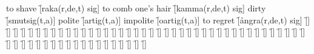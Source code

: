 \begin{questions}
\begin{multicols}{2}
        \question to shave \f[raka(r,de,t) sig]
        \question to comb one's hair \f[kamma(r,de,t) sig]
        \question dirty \f[smutsig(t,a)]
        \question polite \f[artig(t,a)]
        \question impolite \f[oartig(t,a)]
        \question to regret \f[ångra(r,de,t) sig]
        \question \f[]
        \question \f[]
        \question \f[]
        \question \f[]
        \question \f[]
        \question \f[]
        \question \f[]
        \question \f[]
        \question \f[]
        \question \f[]
        \question \f[]
        \question \f[]
        \question \f[]
        \question \f[]
        \question \f[]
        \question \f[]
        \question \f[]
        \question \f[]
        \question \f[]
        \question \f[]
        \question \f[]
        \question \f[]
        \question \f[]
        \question \f[]
        \question \f[]
        \question \f[]
        \question \f[]
        \question \f[]
        \question \f[]
        \question \f[]
        \question \f[]
        \question \f[]
        \question \f[]
        \question \f[]
        \question \f[]
        \question \f[]
        \question \f[]
        \question \f[]
        \question \f[]
        \question \f[]
        \question \f[]
        \question \f[]
        \question \f[]
        \question \f[]
        \question \f[]
        \question \f[]
        \question \f[]
        \question \f[]
        \question \f[]
        \question \f[]
        \question \f[]
        \question \f[]
        \question \f[]
        \question \f[]
        \question \f[]
        \question \f[]
        \question \f[]
        \question \f[]
        \question \f[]
        \question \f[]
    \end{multicols}
\end{questions}
